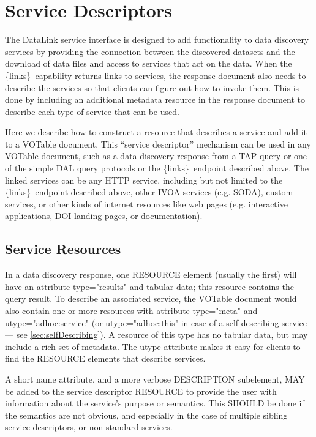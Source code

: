 \documentclass[11pt,a4paper]{ivoa}
\newcommand{\blinks}{\{links\}}
\newcommand{\attval}[2]{#1={\allowbreak}{"}#2{"}}
\begin{document}
\section{Service Descriptors}
\label{sec:serviceDescriptors}

The DataLink service interface is designed to add functionality to data
discovery services by providing the connection between the discovered
datasets and the download of data files and access to services that act
on the data. When the \blinks\ capability returns links to services, the
response document also needs to describe the services so that clients can
figure out how to invoke them. This is done by including an additional
metadata resource in the response document to describe each type of
service that can be used.

Here we describe how to construct a resource that describes a service
and add it to a VOTable document. This ``service descriptor'' mechanism can  
be used in any VOTable document, such as a data discovery response from a TAP query 
or one of the simple DAL query protocols or the \blinks\ endpoint described above. 
The linked services can be any HTTP service, including but not limited to the \blinks\ 
endpoint described above, other IVOA services (e.g. SODA), custom services, or other 
kinds of internet resources like web pages (e.g. interactive applications, DOI landing 
pages, or documentation).

\subsection{Service Resources}
\label{sec:serviceResources}

In a data discovery response, one RESOURCE element (usually the first)
will have an attribute \attval{type}{results} and tabular data; this resource
contains the query result. To describe an associated service, the VOTable document
would also contain one or more resources with attribute \attval{type}{meta} and
\attval{utype}{adhoc:service}  (or \attval{utype}{adhoc:this} in case of
a self-describing service --- see \ref{sec:selfDescribing}). A resource of this 
type has no tabular data, but may include a rich set of metadata. The utype attribute 
makes it easy for clients to find the RESOURCE elements that describe services.

A short name attribute, and a more verbose DESCRIPTION  subelement,
MAY be added to the service descriptor RESOURCE to  provide the user
with information about the service's purpose or  semantics. This SHOULD
be done if the semantics are not obvious,  and especially in the case
of multiple sibling service  descriptors, or non-standard services.
\end{document}
